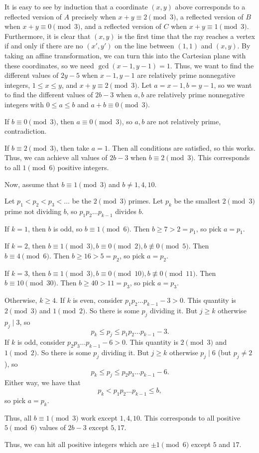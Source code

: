 It is easy to see by induction that a coordinate $\left(x,y\right)$ above corresponds to a reflected version of $A$ precisely when $x+y\equiv2\pmod3$, a reflected version of $B$ when $x+y\equiv0\pmod3$, and a reflected version of $C$ when $x+y\equiv1\pmod3$. Furthermore, it is clear that $\left(x,y\right)$ is the first time that the ray reaches a vertex if and only if there are no $\left(x',y'\right)$ on the line between $\left(1,1\right)$ and $\left(x,y\right)$. By taking an affine transformation, we can turn this into the Cartesian plane with these coordinates, so we need $\gcd\left(x-1,y-1\right)=1$. Thus, we want to find the different values of $2y-5$ when $x-1,y-1$ are relatively prime nonnegative integers, $1\leq x\leq y$, and $x+y\equiv2\pmod3$. Let $a=x-1,b=y-1$, so we want to find the different values of $2b-3$ when $a,b$ are relatively prime nonnegative integers with $0\leq a\leq b$ and $a+b\equiv0\pmod3$.

If $b\equiv0\pmod3$, then $a\equiv0\pmod3$, so $a,b$ are not relatively prime, contradiction.

If $b\equiv2\pmod3$, then take $a=1$. Then all conditions are satisfied, so this works. Thus, we can achieve all values of $2b-3$ when $b\equiv2\pmod3$. This corresponds to all $1\pmod6$ positive integers.

Now, assume that $b\equiv1\pmod3$ and $b\neq1,4,10$.

Let $p_1<p_2<p_3<\ldots$ be the $2\pmod3$ primes. Let $p_k$ be the smallest $2\pmod3$ prime not dividing $b$, so $p_1p_2\ldots p_{k-1}$ divides $b$.

If $k=1$, then $b$ is odd, so $b\equiv1\pmod6$. Then $b\geq7>2=p_1$, so pick $a=p_1$.

If $k=2$, then $b\equiv1\pmod3,b\equiv0\pmod2,b\not\equiv0\pmod5$. Then $b\equiv4\pmod6$. Then $b\geq16>5=p_2$, so pick $a=p_2$.

If $k=3$, then $b\equiv1\pmod3,b\equiv0\pmod{10},b\not\equiv0\pmod{11}$. Then $b\equiv10\pmod{30}$. Then $b\geq40>11=p_3$, so pick $a=p_3$.

Otherwise, $k\geq4$. If $k$ is even, consider $p_1p_2\ldots p_{k-1}-3>0$. This quantity is $2\pmod3$ and $1\pmod2$. So there is some $p_j$ dividing it. But $j\geq k$ otherwise $p_j\mid3$, so \[p_k\leq p_j\leq p_1p_2\ldots p_{k-1}-3.\] If $k$ is odd, consider $p_2p_3\ldots p_{k-1}-6>0$. This quantity is $2\pmod3$ and $1\pmod2$. So there is some $p_j$ dividing it. But $j\geq k$ otherwise $p_j\mid6$ (but $p_j\neq2$), so \[p_k\leq p_j\leq p_2p_3\ldots p_{k-1}-6.\] Either way, we have that \[p_k<p_1p_2\ldots p_{k-1}\leq b,\] so pick $a=p_k$.

Thus, all $b\equiv1\pmod3$ work except $1,4,10$. This corresponds to all positive $5\pmod6$ values of $2b-3$ except  $5,17$.

Thus, we can hit all positive integers which are $\pm1\pmod6$ except $5$ and $17$.